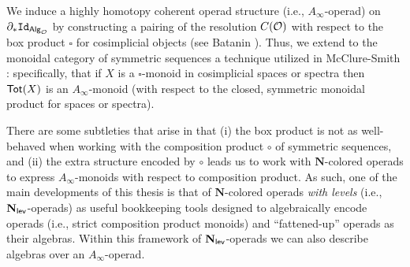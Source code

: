 We induce a highly homotopy coherent operad structure (i.e., $A_{\infty}$-operad) on $\partial_* \mathtt{Id}_{{\mathsf{Alg}_{\mathcal{O}}}}$ by constructing a pairing of the resolution $C(\mathcal{O})$ with respect to the box product $\square$ for cosimplicial objects (see Batanin \cite{Bat-box}). Thus, we extend to the monoidal category of symmetric sequences a technique utilized in McClure-Smith \cite{MS-box}: specifically, that if $X$ is a $\square$-monoid in cosimplicial spaces or spectra then $\operatorname{\mathsf{Tot}}(X)$ is an $A_{\infty}$-monoid (with respect to the closed, symmetric monoidal product for spaces or spectra).

There are some subtleties that arise in that (i) the box product is not as well-behaved when working with the composition product $\circ$ of symmetric sequences, and (ii) the extra structure encoded by $\circ$ leads us to work with $\mathbf{N}$-colored operads to express $A_{\infty}$-monoids with respect to composition product.  As such, one of the main developments of this thesis is that of $\mathbf{N}$-colored operads \textit{with levels} (i.e., $\mathbf{N}_{\mathsf{lev}}$-operads) as useful bookkeeping tools designed to algebraically encode operads (i.e., strict composition product monoids) and ``fattened-up'' operads as their algebras. Within this framework of $\mathbf{N}_{\mathsf{lev}}$-operads we can also describe algebras over an $A_{\infty}$-operad.

